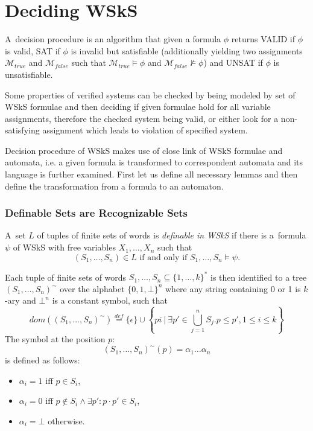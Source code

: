 \section{Deciding WSkS}\label{classical}

A~decision procedure is an algorithm that given a formula $\phi$ returns VALID if $\phi$ is valid, SAT if $\phi$ is invalid but satisfiable (additionally yielding two assignments $\mathcal{M}_{true}$ and $\mathcal{M}_{false}$ such that $\mathcal{M}_{true} \vDash \phi$ and $\mathcal{M}_{false} \not\vDash \phi$) and UNSAT if $\phi$ is unsatisfiable.

Some properties of verified systems can be checked by being modeled by set of WSkS formulae and then deciding if given formulae hold for all variable assignments, therefore the checked system being valid, or either look for a non-satisfying assignment which leads to violation of specified system.

Decision procedure of WSkS makes use of close link of WSkS formulae and automata, i.e. a given formula is transformed to correspondent automata and its language is further examined. First let us define all necessary lemmas and then define the transformation from a formula to an automaton.

 \subsubsection{Definable Sets are Recognizable Sets}
\begin{defz}
 A~set $L$ of tuples of finite sets of words is \emph{definable in WSkS} if there is a~formula $\psi$ of WSkS with free variables $X_1,\ldots,X_n$ such that $$(S_1,\ldots,S_n) \in L \text{ if and only if } S_1,\ldots,S_n \vDash \psi.$$
\end{defz}

Each tuple of finite sets of words $S_1,\ldots,S_n \subseteq \{1,\ldots,k\}^*$
is then identified to a tree $(S_1,\ldots,S_n)^\sim$ over the alphabet
$\{0,1,\bot\}^n$ where any string containing 0 or 1 is $k$-ary and $\bot^n$ is a constant symbol, such that
 \begin{equation}
  dom((S_1,\ldots,S_n)^\sim) \overset{def}{=} \{\epsilon\} \cup \left\{ pi\ |\ \exists p' \in \bigcup_{j = 1}^n S_j.p \leq p', 1 \leq i \leq k\right\}
 \end{equation}
The symbol at the position $p$: $$(S_1,\ldots,S_n)^\sim(p) = \alpha_1\ldots\alpha_n$$ is defined as follows:
 \begin{itemize}
  \item $\alpha_i = 1 \text{ iff } p \in S_i$,
  \item $\alpha_i = 0 \text{ iff } p \notin S_i \wedge \exists p': p\cdot p' \in S_i$,
  \item $\alpha_i = \bot$ otherwise.
 \end{itemize}
 
